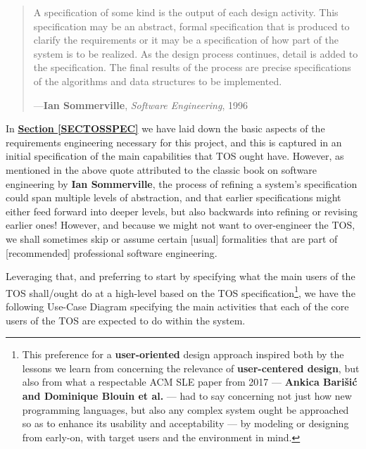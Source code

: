 \documentclass[a4paper, 18pt]{book} %
\begin{document}
{{{\begin{minipage}{1\textwidth}
\begin{quotation}
{A specification of some kind is the output of each design activity. This specification may be an abstract, formal specification that is produced to clarify the requirements or it may be a specification of how part of the system is to be realized. As the design process continues, detail is added to the specification. The final results of the process are precise specifications of the algorithms and data structures to be implemented.

}
\hspace*{\fill} ---\textbf{Ian Sommerville}, \textit{Software Engineering}, 1996\cite{Sommerville1996Software}
\end{quotation}
\vspace{2em}
\end{minipage}




\vspace{2em}

In \textbf{\hyperref[SECTOSSPEC]{Section \ref{SECTOSSPEC}}} we have laid down the basic aspects of the requirements engineering necessary for this project, and this is captured in an initial specification of the main capabilities that TOS ought have. However, as mentioned in the above quote attributed to the classic book on software engineering\cite{Sommerville1996Software} by \textbf{Ian Sommerville}, the process of refining a system's specification could span multiple levels of abstraction, and that earlier specifications might either feed forward into deeper levels, but also backwards into refining or revising earlier ones! However, and because we might not want to over-engineer the TOS, we shall sometimes skip or assume certain [usual] formalities that are part of [recommended] professional software engineering.


\vspace{2em}


Leveraging that, and preferring to start by specifying what the main users of the TOS shall/ought do at a high-level based on the TOS specification\footnote{This preference for a \textbf{user-oriented} design approach inspired both by the lessons we learn from \cite{Sommerville1996Software} concerning the relevance of \textbf{user-centered design}, but also from what a respectable ACM SLE paper from 2017 --- \textbf{Ankica Barišić and Dominique Blouin et al.}\cite{Barisic2017UsabilityDSL} ---  had to say concerning not just how new programming languages, but also any complex system ought be approached so as to enhance its usability and acceptability --- by modeling or designing from early-on, with target users and the environment in mind.}, we have the following Use-Case Diagram\cite{lutalo_2026_19592521_tos_usecase} specifying the main activities that each of the core users of the TOS are expected to do within the system. 

}}}
\end{document}

